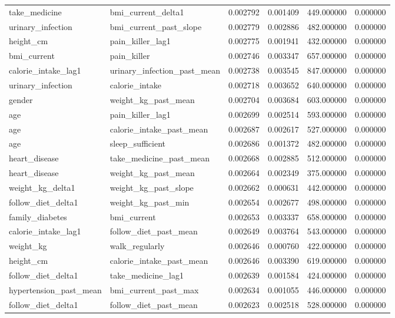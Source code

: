 \begin{longtable}{llrrrr}
take\_medicine & bmi\_current\_delta1 & 0.002792 & 0.001409 & 449.000000 & 0.000000 \\
urinary\_infection & bmi\_current\_past\_slope & 0.002779 & 0.002886 & 482.000000 & 0.000000 \\
height\_cm & pain\_killer\_lag1 & 0.002775 & 0.001941 & 432.000000 & 0.000000 \\
bmi\_current & pain\_killer & 0.002746 & 0.003347 & 657.000000 & 0.000000 \\
calorie\_intake\_lag1 & urinary\_infection\_past\_mean & 0.002738 & 0.003545 & 847.000000 & 0.000000 \\
urinary\_infection & calorie\_intake & 0.002718 & 0.003652 & 640.000000 & 0.000000 \\
gender & weight\_kg\_past\_mean & 0.002704 & 0.003684 & 603.000000 & 0.000000 \\
age & pain\_killer\_lag1 & 0.002699 & 0.002514 & 593.000000 & 0.000000 \\
age & calorie\_intake\_past\_mean & 0.002687 & 0.002617 & 527.000000 & 0.000000 \\
age & sleep\_sufficient & 0.002686 & 0.001372 & 482.000000 & 0.000000 \\
heart\_disease & take\_medicine\_past\_mean & 0.002668 & 0.002885 & 512.000000 & 0.000000 \\
heart\_disease & weight\_kg\_past\_mean & 0.002664 & 0.002349 & 375.000000 & 0.000000 \\
weight\_kg\_delta1 & weight\_kg\_past\_slope & 0.002662 & 0.000631 & 442.000000 & 0.000000 \\
follow\_diet\_delta1 & weight\_kg\_past\_min & 0.002654 & 0.002677 & 498.000000 & 0.000000 \\
family\_diabetes & bmi\_current & 0.002653 & 0.003337 & 658.000000 & 0.000000 \\
calorie\_intake\_lag1 & follow\_diet\_past\_mean & 0.002649 & 0.003764 & 543.000000 & 0.000000 \\
weight\_kg & walk\_regularly & 0.002646 & 0.000760 & 422.000000 & 0.000000 \\
height\_cm & calorie\_intake\_past\_mean & 0.002646 & 0.003390 & 619.000000 & 0.000000 \\
follow\_diet\_delta1 & take\_medicine\_lag1 & 0.002639 & 0.001584 & 424.000000 & 0.000000 \\
hypertension\_past\_mean & bmi\_current\_past\_max & 0.002634 & 0.001055 & 446.000000 & 0.000000 \\
follow\_diet\_delta1 & follow\_diet\_past\_mean & 0.002623 & 0.002518 & 528.000000 & 0.000000 \\

\end{longtable}
